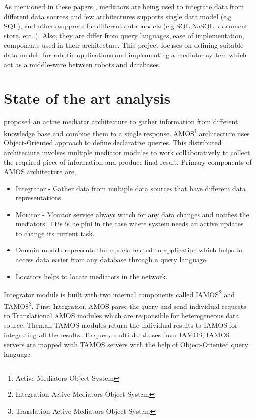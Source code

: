 \documentclass[12pt]{article}
\begin{document}
As mentioned in these papers \cite{ahmed1991pegasus,fahl1993amos,arens1996query,chawathe1994tsimmis,chawathe1994tsimmis,shoens1993rufus}, mediators are being used to integrate data from different data sources and few architectures supports single data model (e.g SQL), and others supports for different data models (e.g SQL,NoSQL, document store, etc..). Also, they are differ from query languages, ease of implementation, components used in their architecture. This project focuses on defining suitable data models for robotic applications and implementing a mediator system which act as a middle-ware between robots and databases. 

\section{State of the art analysis}

\citet{fahl1993amos} proposed an active mediator architecture to gather information from different knowledge base and combine them to a single response. AMOS\footnote{\label{amos}Active Mediators Object System} architecture uses Object-Oriented approach to define declarative queries. This distributed architecture involves multiple mediator modules to work collaboratively to collect the required piece of information and produce final result. Primary components of AMOS architecture are,
\begin{itemize}
	\item Integrator - Gather data from multiple data sources that have different data representations.
	\item Monitor - Monitor service always watch for any data changes and notifies the mediators. This is helpful in the case where system needs an active updates to change its current task.
	\item Domain models represents the models related to application which helps to access data easier from any database through a query language.
	\item Locators helps to locate mediators in the network.
\end{itemize}


Integrator module is built with two internal components called IAMOS\footnote{\label{amos}Integration Active Mediators Object System} and TAMOS\footnote{\label{amos}Translation Active Mediators Object System}. 
First Integration AMOS parse the query and send individual requests to Translational AMOS modules which are responsible for heterogeneous data source.
Then,all TAMOS modules return the individual results to IAMOS for integrating all the results. To query multi databases from IAMOS, IAMOS servers are mapped with TAMOS servers with the help of Object-Oriented query language.
\end{document}
